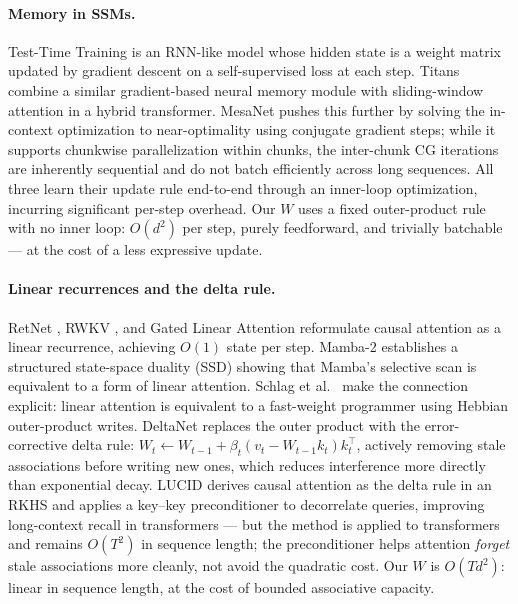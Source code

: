 \documentclass{article}
\begin{document}
\paragraph{Memory in SSMs.}
Test-Time Training \citep[TTT;][]{sun2024learning} is an RNN-like model whose hidden state is a weight matrix updated by gradient descent on a self-supervised loss at each step. Titans \citep{behrouz2024titans} combine a similar gradient-based neural memory module with sliding-window attention in a hybrid transformer. MesaNet \citep{von2025mesanet} pushes this further by solving the in-context optimization to near-optimality using conjugate gradient steps; while it supports chunkwise parallelization within chunks, the inter-chunk CG iterations are inherently sequential and do not batch efficiently across long sequences. All three learn their update rule end-to-end through an inner-loop optimization, incurring significant per-step overhead. Our $W$ uses a fixed outer-product rule with no inner loop: $O(d^2)$ per step, purely feedforward, and trivially batchable --- at the cost of a less expressive update.

\paragraph{Linear recurrences and the delta rule.}
RetNet \citep{sun2023retentive}, RWKV \citep{peng2023rwkv}, and Gated Linear Attention \citep{yang2023gated} reformulate causal attention as a linear recurrence, achieving $O(1)$ state per step. Mamba-2 \citep{dao2024mamba2} establishes a structured state-space duality (SSD) showing that Mamba's selective scan is equivalent to a form of linear attention. Schlag et al.~\citep{schlag2021linear} make the connection explicit: linear attention is equivalent to a fast-weight programmer using Hebbian outer-product writes. DeltaNet \citep{yang2024deltanet} replaces the outer product with the error-corrective delta rule: $W_t \leftarrow W_{t-1} + \beta_t(v_t - W_{t-1}k_t)k_t^\top$, actively removing stale associations before writing new ones, which reduces interference more directly than exponential decay. LUCID \citep{duvvuri2026lucid} derives causal attention as the delta rule in an RKHS and applies a key--key preconditioner to decorrelate queries, improving long-context recall in transformers --- but the method is applied to transformers and remains $O(T^2)$ in sequence length; the preconditioner helps attention \emph{forget} stale associations more cleanly, not avoid the quadratic cost. Our $W$ is $O(Td^2)$: linear in sequence length, at the cost of bounded associative capacity.
\end{document}
